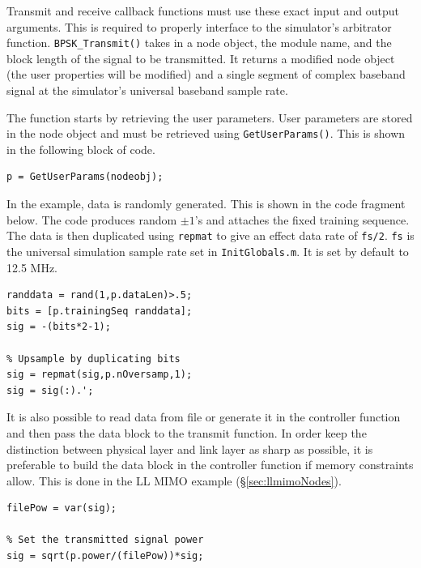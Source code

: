Transmit and receive callback functions must use these exact input
and output arguments.  This is required to properly interface to the
simulator's arbitrator function.  \verb+BPSK_Transmit()+ takes in a
node object, the module name, and the block length of the signal to
be transmitted.  It returns a modified node object (the user
properties will be modified) and a single segment of complex
baseband signal at the simulator's universal baseband sample rate.

The function starts by retrieving the user parameters.  User
parameters are stored in the node object and must be retrieved using
\verb+GetUserParams()+.  This is shown in the following block of
code.

\begin{lstlisting}[firstnumber=31, name=bpskTx]
% Load user parameters
p = GetUserParams(nodeobj);

\end{lstlisting}

In the example, data is randomly generated.  This is shown in the
code fragment below.  The code produces random $\pm 1$'s and
attaches the fixed training sequence.  The data is then duplicated
using \verb+repmat+ to give an effect data rate of \verb+fs/2+.
\verb+fs+ is the universal simulation sample rate set in
\verb+InitGlobals.m+. It is set by default to 12.5 MHz.

\begin{lstlisting}[name=bpskTx]
% Make some random data and attach training sequence
randdata = rand(1,p.dataLen)>.5;
bits = [p.trainingSeq randdata];
sig = -(bits*2-1);

% Upsample by duplicating bits
sig = repmat(sig,p.nOversamp,1);
sig = sig(:).';

\end{lstlisting}

It is also possible to read data from file or generate it in the
controller function and then pass the data block to the transmit
function.  In order keep the distinction between physical layer and
link layer as sharp as possible, it is preferable to build the data
block in the controller function if memory constraints allow.  This
is done in the LL MIMO example (\S\ref{sec:llmimoNodes}).

\begin{lstlisting}[name=bpskTx]
% Calculate signal power (Watts)
filePow = var(sig);

% Set the transmitted signal power
sig = sqrt(p.power/(filePow))*sig;

\end{lstlisting}


